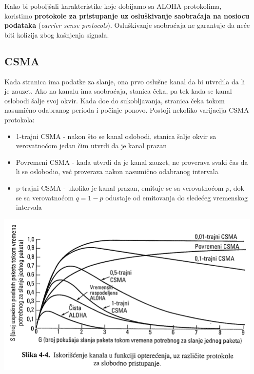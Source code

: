 \documentclass{article} %
\begin{document}
Kako bi pobolj\v{s}ali karakteristike koje dobijamo sa ALOHA protokolima, koristimo \textbf{protokole za pristupanje uz oslu\v{s}kivanje saobra\'{c}aja na nosiocu podataka} (\textit{carrier sense protocols}). Oslu\v{s}kivanje saobra\'{c}aja ne garantuje da ne\'{c}e biti kolizija zbog ka\v{s}njenja signala.

\subsection{CSMA}

Kada stranica ima podatke za slanje, ona prvo oslu\v{s}ne kanal da bi utvrdila da li je zauzet. Ako na kanalu ima saobra\'{c}aja, stanica \v{c}eka, pa tek kada se kanal oslobodi \v{s}alje svoj okvir. Kada do\dj{}e do sukobljavanja, stranica \v{c}eka tokom nasumi\v{c}no odabranog perioda i po\v{c}inje ponovo. Postoji nekoliko varijacija CSMA protokola:
\begin{itemize}
	\item 1-trajni CSMA - nakon \v{s}to se kanal oslobodi, stanica \v{s}alje okvir sa verovatno\'{c}om jedan \v{c}im utvrdi da je kanal prazan
	\item Povremeni CSMA - kada utvrdi da je kanal zauzet, ne proverava svaki \v{c}as da li se oslobodio, ve\'{c} proverava nakon nasumi\v{c}no odabranog intervala
	\item p-trajni CSMA - ukoliko je kanal prazan, emituje se sa verovatno\'{c}om $p$, dok se sa verovatno\'{c}om $q=1-p$ odustaje od emitovanja do slede\'{c}eg vremenskog intervala
\end{itemize}

\begin{center}
\includegraphics[scale=0.5]{csma}
\end{center}
\end{document}

